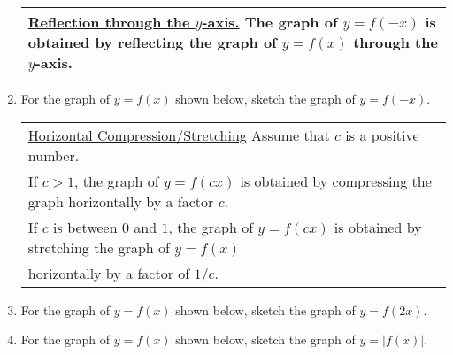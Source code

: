 \begin{enumerate}



  \begin{tabular}{| p{} |} \hline
    \underline{Reflection through the $y$-axis.} The graph of
    $y=f(-x)$ is  obtained by reflecting the graph of $y=f(x)$
    through the $y$-axis.
    \\ \hline
  \end{tabular} 

\vspace{-.1in}
\item For the graph of $y=f(x)$ shown below, sketch the graph of $y=f(-x)$.\\






\hspace{-.4in} \begin{tabular}{| l |} \hline \underline{Horizontal Compression/Stretching} Assume that $c$ is a positive number. \\
If $c>1$, the graph of $y=f(cx)$ is obtained by compressing the graph horizontally by a factor $c$. \\
If $c$ is between $0$ and $1$, the graph of $y=f(cx)$ is obtained by stretching the graph of $y=f(x)$ \\ horizontally by a factor of $1/c$.
 \\ \hline
\end{tabular} 

\vspace{-.1in}
\item For the graph of $y=f(x)$ shown below, sketch the graph of $y=f(2x)$.\\

\newpage
\item For the graph of $y=f(x)$ shown below, sketch the graph of $y = |f(x)|$.\\
 \\[2in]





\end{enumerate}

